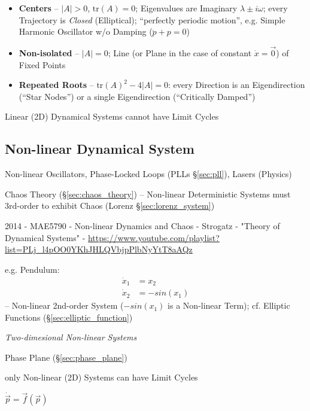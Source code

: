 \begin{itemize}
\begin{itemize}
      \item \textbf{Centers} -- $|A| > 0$, $\mathrm{tr}(A) = 0$; Eigenvalues
        are Imaginary $\lambda \pm i\omega$; every Trajectory is \emph{Closed}
        (Elliptical); ``perfectly periodic motion'', e.g. Simple Harmonic
        Oscillator w/o Damping ($\ddot{p} + p = 0$)
      \item \textbf{Non-isolated} -- $|A| = 0$; Line (or Plane in the case of
        constant $\dot{x} = \vec{0}$) of Fixed Points
      \item \textbf{Repeated Roots} -- $\mathrm{tr}(A)^2 - 4|A| = 0$: every
        Direction is an Eigendirection (``Star Nodes'') or a single
        Eigendirection (``Critically Damped'')
    \end{itemize}
\end{itemize}

Linear (2D) Dynamical Systems cannot have Limit Cycles



\subsection{Non-linear Dynamical System}\label{sec:nonlinear_dynamical_system}

Non-linear Oscillators, Phase-Locked Loops (PLLs \S\ref{sec:pll}), Lasers
(Physics)

\fist Chaos Theory (\S\ref{sec:chaos_theory}) -- Non-linear Deterministic
Systems must 3rd-order to exhibit Chaos (Lorenz \S\ref{sec:lorenz_system})

2014 - MAE5790 - Non-linear Dynamics and Chaos - Strogatz - "Theory of
Dynamical Systems" -
\url{https://www.youtube.com/playlist?list=PLj_l4pOO0YKhJHLQVbjpPlbNyYtT8aAQz}

e.g. Pendulum:
\begin{align*}
  \dot{x}_1 & = x_2 \\
  \dot{x}_2 & = -sin(x_1)
\end{align*}
-- Non-linear 2nd-order System ($-sin(x_1)$ is a Non-linear Term); cf. Elliptic
Functions
(\S\ref{sec:elliptic_function})

\emph{Two-dimesional Non-linear Systems}

\fist Phase Plane (\S\ref{sec:phase_plane})

only Non-linear (2D) Systems can have Limit Cycles

$\dot{\vec{p}} = \vec{f}(\vec{p})$


